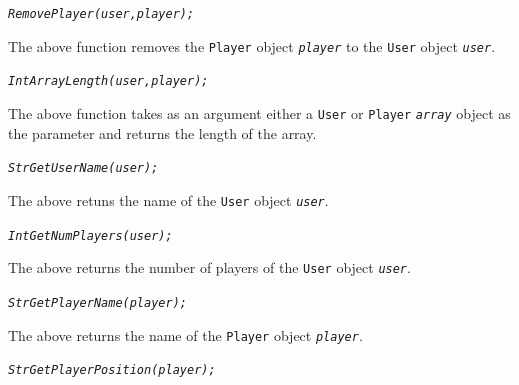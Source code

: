 \documentclass[12pt]{report}
\begin{document}
\begin{alltt}\begin{singlespace}
            \textit{RemovePlayer(user, player);}\end{singlespace}
\end{alltt}

The above function removes the \texttt{Player} object \textit{\texttt{player}} to the \texttt{User} object \textit{\texttt{user}}.

\begin{alltt}\begin{singlespace}
            \textit{Int ArrayLength(user, player);}\end{singlespace}
\end{alltt}

The above function takes as an argument either a \texttt{User} or \texttt{Player} \textit{\texttt{array}} object as the parameter and returns the length of the array.

\begin{alltt}\begin{singlespace}
            \textit{Str GetUserName(user);}\end{singlespace}
\end{alltt}

The above retuns the name of the \texttt{User} object \textit{\texttt{user}}.

\begin{alltt}\begin{singlespace}
            \textit{Int GetNumPlayers(user);}\end{singlespace}
\end{alltt}
     
The above returns the number of players of the \texttt{User} object \textit{\texttt{user}}.

\begin{alltt}\begin{singlespace}
            \textit{Str GetPlayerName(player);}\end{singlespace}
\end{alltt}

The above returns the name of the \texttt{Player} object \textit{\texttt{player}}.

\begin{alltt}\begin{singlespace}
            \textit{Str GetPlayerPosition(player);}\end{singlespace}
\end{alltt}
\end{document}
